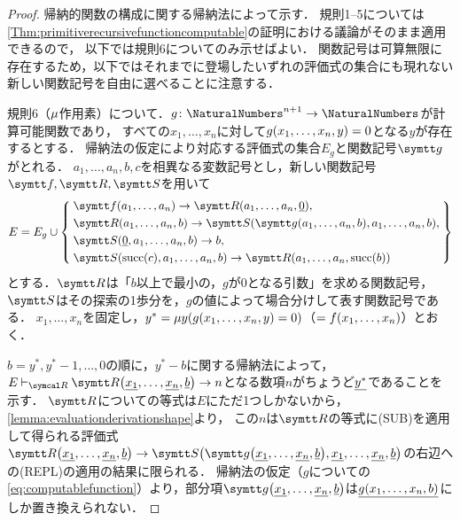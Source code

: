 \begin{proof}
	帰納的関数の構成に関する帰納法によって示す．
	規則1--5については\cref{Thm:primitiverecursivefunctioncomputable}の証明における議論がそのまま適用できるので，
	以下では規則6についてのみ示せばよい．
	関数記号は可算無限に存在するため，以下ではそれまでに登場したいずれの評価式の集合にも現れない新しい関数記号を自由に選べることに注意する．

	規則6（\(\mu\)作用素）について．\(g \colon \NaturalNumbers^{n+1} \to \NaturalNumbers\)が計算可能関数であり，
	すべての\(x_1, \dots, x_n\)に対して\(\apply{g}{x_1, \dots, x_n, y} = 0\)となる\(y\)が存在するとする．
	帰納法の仮定により対応する評価式の集合\(E_g\)と関数記号\(\obj{g}\)がとれる．
	\(a_1, \dots, a_n, b, c\)を相異なる変数記号とし，新しい関数記号\(\obj{f}, \obj{R}, \obj{S}\)を用いて
	\begin{align*}
		E = E_g \cup \Set{
			\begin{aligned}
				 & \apply{\obj{f}}{a_1, \dots, a_n} \evaluate \apply{\obj{R}}{a_1, \dots, a_n, \numeral{0}},                                  \\
				 & \apply{\obj{R}}{a_1, \dots, a_n, b} \evaluate \apply{\obj{S}}{\apply{\obj{g}}{a_1, \dots, a_n, b}, a_1, \dots, a_n, b},    \\
				 & \apply{\obj{S}}{\numeral{0}, a_1, \dots, a_n, b} \evaluate b,                                                              \\
				 & \apply{\obj{S}}{\apply{\succfunc}{c}, a_1, \dots, a_n, b} \evaluate \apply{\obj{R}}{a_1, \dots, a_n, \apply{\succfunc}{b}}
			\end{aligned}
		}
	\end{align*}
	とする．\(\obj{R}\)は「\(b\)以上で最小の，\(g\)が0となる引数」を求める関数記号，\(\obj{S}\)はその探索の1歩分を，\(g\)の値によって場合分けして表す関数記号である．
	\(x_1, \dots, x_n\)を固定し，\(y^{\ast} = \apply{\muoperator y}{\apply{g}{x_1, \dots, x_n, y} = 0}\)（\(= \apply{f}{x_1, \dots, x_n}\)）とおく．

	\(b = y^{\ast}, y^{\ast} - 1, \dots, 0\)の順に，\(y^{\ast} - b\)に関する帰納法によって，
	\(E \evaluatable \apply{\obj{R}}{\numeral{x_1}, \dots, \numeral{x_n}, \numeral{b}} \evaluate n\)となる数項\(n\)がちょうど\(\underline{y^{\ast}}\)であることを示す．
	\(\obj{R}\)についての等式は\(E\)にただ1つしかないから，\cref{lemma:evaluationderivationshape}より，
	この\(n\)は\(\obj{R}\)の等式に(SUB)を適用して得られる評価式\(\apply{\obj{R}}{\numeral{x_1}, \dots, \numeral{x_n}, \numeral{b}} \evaluate \apply{\obj{S}}{\apply{\obj{g}}{\numeral{x_1}, \dots, \numeral{x_n}, \numeral{b}}, \numeral{x_1}, \dots, \numeral{x_n}, \numeral{b}}\)の右辺への(REPL)の適用の結果に限られる．
	帰納法の仮定（\(g\)についての\cref{eq:computablefunction}）より，部分項\(\apply{\obj{g}}{\numeral{x_1}, \dots, \numeral{x_n}, \numeral{b}}\)は\(\numeral{\apply{g}{x_1, \dots, x_n, b}}\)にしか置き換えられない．


\end{proof}

